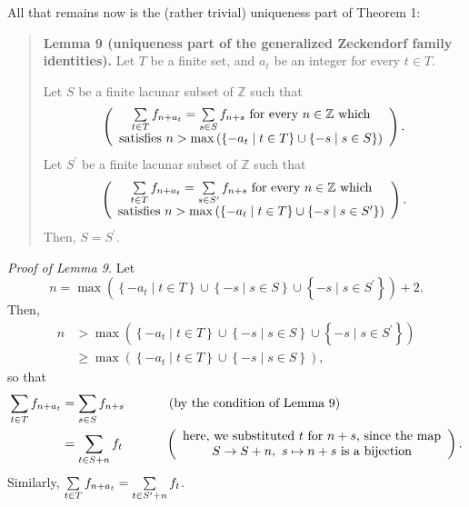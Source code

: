 \documentclass[numbers=enddot,12pt,final,onecolumn,notitlepage]{scrartcl}%
\numberwithin{exer}{section}
\theoremstyle{definition}
\let\sumnonlimits\sum
\renewcommand{\sum}{\sumnonlimits\limits}
\begin{document}
All that remains now is the (rather trivial) uniqueness part of Theorem 1:

\begin{quote}
\textbf{Lemma 9 (uniqueness part of the generalized Zeckendorf family
identities).} Let $T$ be a finite set, and $a_{t}$ be an integer for every
$t\in T$.

Let $S$ be a finite lacunar subset of $\mathbb{Z}$ such that%
\[
\left(
\begin{array}
[c]{c}%
\sum\limits_{t\in T}f_{n+a_{t}}=\sum\limits_{s\in S}f_{n+s}\text{ for every
}n\in\mathbb{Z}\text{ which}\\
\text{satisfies }n>\max\left(  \left\{  -a_{t}\mid t\in T\right\}
\cup\left\{  -s\mid s\in S\right\}  \right)
\end{array}
\right)  .
\]
Let $S^{\prime}$ be a finite lacunar subset of $\mathbb{Z}$ such that%
\[
\left(
\begin{array}
[c]{c}%
\sum\limits_{t\in T}f_{n+a_{t}}=\sum\limits_{s\in S^{\prime}}f_{n+s}\text{ for
every }n\in\mathbb{Z}\text{ which}\\
\text{satisfies }n>\max\left(  \left\{  -a_{t}\mid t\in T\right\}
\cup\left\{  -s\mid s\in S^{\prime}\right\}  \right)
\end{array}
\right)  .
\]
Then, $S=S^{\prime}$.
\end{quote}

\textit{Proof of Lemma 9.} Let%
\[
n=\max\left(  \left\{  -a_{t}\mid t\in T\right\}  \cup\left\{  -s\mid s\in
S\right\}  \cup\left\{  -s\mid s\in S^{\prime}\right\}  \right)  +2.
\]
Then,%
\begin{align*}
n  &  >\max\left(  \left\{  -a_{t}\mid t\in T\right\}  \cup\left\{  -s\mid
s\in S\right\}  \cup\left\{  -s\mid s\in S^{\prime}\right\}  \right) \\
&  \geq\max\left(  \left\{  -a_{t}\mid t\in T\right\}  \cup\left\{  -s\mid
s\in S\right\}  \right)  ,
\end{align*}
so that%
\begin{align*}
\sum\limits_{t\in T}f_{n+a_{t}}  &  =\sum\limits_{s\in S}f_{n+s}%
\ \ \ \ \ \ \ \ \ \ \left(  \text{by the condition of Lemma 9}\right) \\
&  =\sum\limits_{t\in S+n}f_{t}\ \ \ \ \ \ \ \ \ \ \left(
\begin{array}
[c]{c}%
\text{here, we substituted }t\text{ for }n+s\text{, since the map}\\
S\rightarrow S+n,\ s\mapsto n+s\text{ is a bijection}%
\end{array}
\right)  .
\end{align*}
Similarly, $\sum\limits_{t\in T}f_{n+a_{t}}=\sum\limits_{t\in S^{\prime}%
+n}f_{t}$.
\end{document}
